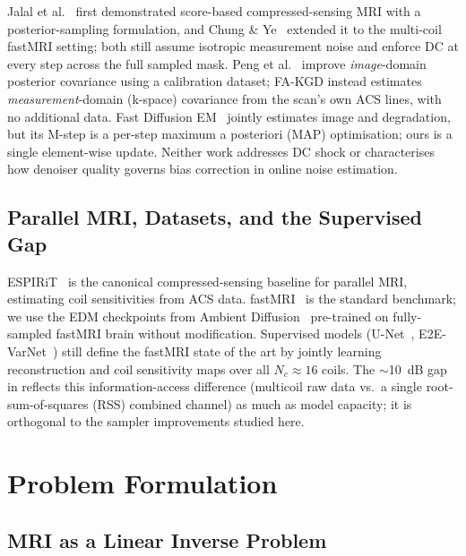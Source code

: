 \documentclass[10pt,twocolumn,letterpaper]{article}
\begin{document}
Jalal et al.~\cite{jalal2021robust} first demonstrated score-based
compressed-sensing MRI with a posterior-sampling formulation, and Chung \&
Ye~\cite{chung2022scoremri} extended it to the multi-coil fastMRI setting;
both still assume isotropic measurement noise and enforce DC at every step
across the full sampled mask.
Peng et al.~\cite{peng2024optimal} improve \emph{image}-domain posterior
covariance using a calibration dataset; FA-KGD instead estimates
\emph{measurement}-domain (k-space) covariance from the scan's own ACS lines,
with no additional data. Fast Diffusion EM~\cite{laroche2024fastdiffem}
jointly estimates image and degradation, but its M-step is a per-step
maximum a posteriori (MAP) optimisation; ours is a single element-wise
update. Neither work addresses
DC shock or characterises how denoiser quality governs bias correction in
online noise estimation.

\subsection{Parallel MRI, Datasets, and the Supervised Gap}

ESPIRiT~\cite{uecker2014espirit} is the canonical compressed-sensing baseline
for parallel MRI, estimating coil sensitivities from ACS data.
fastMRI~\cite{zbontar2018fastmri} is the standard benchmark; we use the EDM
checkpoints from Ambient Diffusion~\cite{daras2025ambient} pre-trained on
fully-sampled fastMRI brain without modification. Supervised models
(U-Net~\cite{zbontar2018fastmri}, E2E-VarNet~\cite{sriram2020varnet}) still define the fastMRI state of the
art by jointly learning reconstruction and coil sensitivity maps over all
$N_c\!\approx\!16$ coils. The $\sim$10~dB gap in 
reflects this information-access difference (multicoil raw data vs.\ a single
root-sum-of-squares (RSS) combined channel) as much as model capacity;
it is orthogonal to the
sampler improvements studied here.

\section{Problem Formulation}
\label{sec:problem}

\subsection{MRI as a Linear Inverse Problem}
\end{document}
